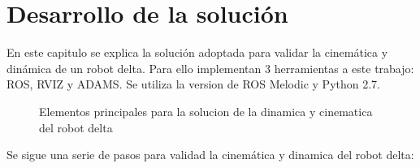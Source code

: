 \chapter{Desarrollo de la solución}\label{CAP6}
    
    
    En este capitulo se explica la solución adoptada para validar la cinemática y dinámica de un robot delta. Para ello implementan 3 herramientas a este trabajo: ROS, RVIZ y ADAMS. Se utiliza la version de ROS Melodic y Python 2.7.
    
    \begin{figure}[h]
        \centering
        \caption{Elementos principales para la solucion de la dinamica y cinematica del robot delta}
        \label{fig:cap6_intro_1}
    \end{figure}

    Se sigue una serie de pasos para validad la cinemática y dinamica del robot delta:
    
